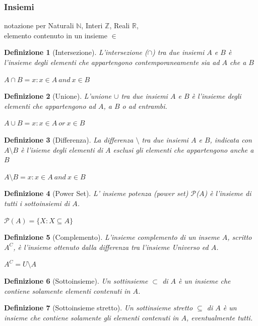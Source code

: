 \documentclass[a4paper]{article}
\newtheorem*{definition}{Definizione}
\begin{document}
\subsubsection{Insiemi}
notazione per Naturali $ \mathbb{N} $, Interi $ \mathbb{Z} $, Reali $ \mathbb{R} $,\\ elemento contenuto in un insieme $ \in $
\newline
\begin{definition}[Intersezione]L'intersezione ($\cap$) tra due insiemi $A$ e $B$ è l'insieme degli elementi che appartengono contemporaneamente sia ad $A$ che a $B$\\ 
	\begin{center}$A \cap B = {x:x \in A \: and \: x \in B}$\end{center}
\end{definition}
\begin{definition}[Unione]L'unione $\cup$ tra due insiemi $A$ e $B$ è l'insieme degli elementi che appartengono ad $A$, a $B$ o ad entrambi.
	\begin{center}$A \cup B = {x:x \in A \: or \: x \in B}$\end{center}
\end{definition}
\begin{definition}[Differenza]La differenza $\setminus$ tra due insiemi $A$ e $B$, indicata con $A \setminus B$ è l'isieme degli elementi di $A$ esclusi gli elementi che appartengono anche a $B$
	\begin{center}$A \setminus B = {x:x \in A \: and \: x \in B}$\end{center}
\end{definition}
\begin{definition}[Power Set]L' insieme potenza (power set) $\mathcal{P}$($A$) è l'insieme di tutti i sottoinsiemi di $A$.\begin{center} $\mathcal{P}(A)=\{X : X \subseteq A\}$ \end{center}
\end{definition}
\begin{definition}[Complemento]L'insieme complemento di un inseme $A$, scritto $A^{C}$, è l'insieme ottenuto dalla differenza tra l'insieme Universo ed $A$.\begin{center} $A^{C} = U \setminus A$\end{center}
\end{definition}
\begin{definition}[Sottoinsieme]Un sottinsieme $ \subset $ di $A$ è un insieme che contiene solamente elementi contenuti in $A$.
\end{definition}
\begin{definition}[Sottoinsieme stretto]Un sottinsieme stretto $ \subseteq $  di $A$ è un insieme che contiene solamente gli elementi contenuti in $A$, eventualmente tutti.
\end{definition}
\end{document}
